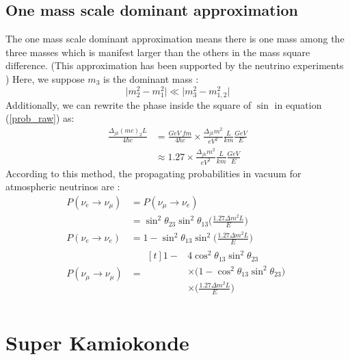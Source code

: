 \documentclass[12pt]{article}
\begin{document}
\begin{multicols}{2}
        \subsection{One mass scale dominant approximation}
        The one mass scale dominant approximation means there is one mass among the three masses which is manifest larger than the others in the mass square difference. (This approximation has been supported by the neutrino experiments \cite{SKexp}) Here, we suppose $m_3$ is the dominant mass :
        \[
            \big| m_{2}^{2} - m_{1}^{2} \big| \ll \big| m_{3}^{2} - m_{1,2}^{2} \big|
        \]
        Additionally, we can rewrite the phase inside the square of $\sin$ in equation (\ref{prob_raw}) as:
        \begin{align*}
            \frac{\Delta_{jk}(mc)_{2}L}{4 \hbar c} &= \frac{GeV\ fm}{4 \hbar c} \times \frac{\Delta_{jk} m^2}{eV^2} \frac{L}{km} \frac{GeV}{E}\\
            &\approx 1.27 \times \frac{\Delta_{jk} m^2}{eV^2} \frac{L}{km} \frac{GeV}{E}
        \end{align*}
        According to this method, the propagating probabilities in vacuum for atmospheric neutrinos are \cite{SKexp} : 
        \begin{align*}
                P(\nu_{e} \rightarrow \nu_{\mu})    &= P(\nu_{\mu}\rightarrow \nu_{e})\\
                                                    &= \sin^{2}\theta_{23} \sin^{2}\theta_{13} \Big( \frac{1.27 \Delta m^{2} L}{E} \Big)\\
                P(\nu_{e} \rightarrow \nu_{e})      &= 1 - \sin^{2}\theta_{13}\sin^{2} \Big( \frac{1.27\Delta m^{2} L}{E} \Big)\\ 
                P(\nu_{\mu} \rightarrow \nu_{\mu})  &= \begin{aligned}[t]
                                                            1 - &4 \cos^{2}\theta_{13}\sin^{2}\theta_{23}\\
                                                                &\times \big( 1 - \cos^{2}\theta_{13}\sin^{2} \theta_{23} \big)\\
                                                                &\times \Big( \frac{1.27\Delta m^{2} L}{E} \Big)\\
                                                        \end{aligned}
        \end{align*}
        

\section{Super Kamiokonde}
    

\end{multicols}
\end{document}
